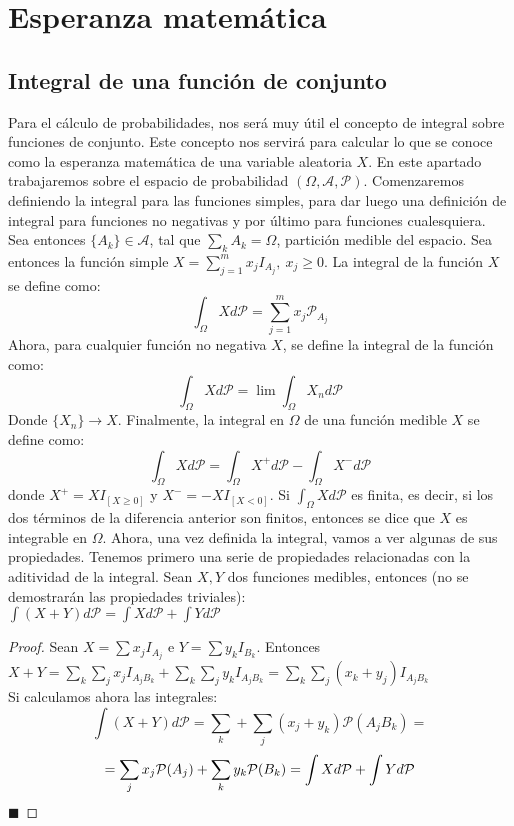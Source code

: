 \documentclass[12pt,a4paper]{book}
\newcommand*{\qed}{\hfill\ensuremath{\blacksquare}}
\begin{document}
\chapter{Esperanza matemática}

\section{Integral de una función de conjunto}

Para el cálculo de probabilidades, nos será muy útil el concepto de integral sobre funciones de conjunto. Este concepto nos servirá para calcular lo que se conoce como la esperanza matemática de una variable aleatoria $X$. En este apartado trabajaremos sobre el espacio de probabilidad $(\Omega, \mathcal{A}, \mathcal{P})$. Comenzaremos definiendo la integral para las funciones simples, para dar luego una definición de integral para funciones no negativas y por último para funciones cualesquiera.\\

Sea entonces $\{A_k\} \in \mathcal{A}$, tal que $\displaystyle \sum_k A_k = \Omega$, partición medible del espacio. Sea entonces la función simple $X = \displaystyle \sum_{j=1}^m x_jI_{A_j},\ x_j \geq 0$. La integral de la función $X$ se define como:
$$\int_{\Omega} X d\mathcal{P} = \sum_{j=1}^m x_j\mathcal{P}_{A_j}$$
Ahora, para cualquier función no negativa $X$, se define la integral de la función como:
$$\int_{\Omega} X d\mathcal{P} = \lim \int_{\Omega}X_n d \mathcal{P}$$
Donde $\{X_{n}\} \to X$. Finalmente, la integral en $\Omega$ de una función medible $X$ se define como:
$$\int_{\Omega} X d\mathcal{P} = \int_{\Omega}X^{+} d\mathcal{P} - \int_{\Omega} X^{-} d\mathcal{P}$$
donde $X^{+} = XI_{[X\geq0]}$ y $X^{-} = -XI_{[X<0]}$. Si $\displaystyle \int_{\Omega}Xd\mathcal{P}$ es finita, es decir, si los dos términos de la diferencia anterior son finitos, entonces se dice que $X$ es integrable en $\Omega$. Ahora, una vez definida la integral, vamos a ver algunas de sus propiedades. Tenemos primero una serie de propiedades relacionadas con la aditividad de la integral. Sean $X,Y$ dos funciones medibles, entonces (no se demostrarán las propiedades triviales):\\

$\displaystyle \int (X+Y)d\mathcal{P} = \int Xd\mathcal{P} + \int Yd\mathcal{P}$\\

\begin{proof}

Sean $X = \displaystyle \sum x_jI_{A_j}$ e $Y = \displaystyle \sum y_kI_{B_k}$. Entonces $X+Y = \displaystyle \sum_k \sum_j x_j I_{A_jB_k} + \sum_k \sum_j y_k I_{A_jB_k} = \sum_k \sum_j (x_k+y_j) I_{A_jB_k}$\\

Si calculamos ahora las integrales:
$$ \int (X+Y)d\mathcal{P} = \sum_k + \sum_j (x_j + y_k) \mathcal{P}(A_jB_k) =$$
$$ = \sum_j x_j \mathcal{P}(A_j) + \sum_k y_k \mathcal{P}(B_k) = \int Xd\mathcal{P} + \int Yd\mathcal{P}\\$$
\qed
\end{proof}
\end{document}

